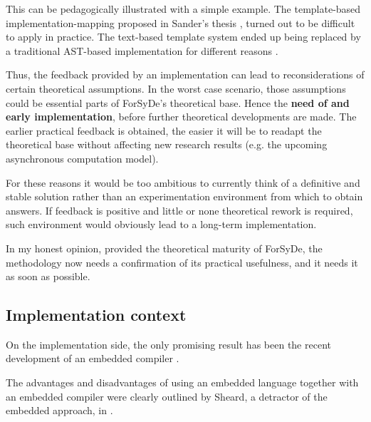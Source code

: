 \documentclass[a4paper,twoside,11pt]{article}
\begin{document}
  This can be pedagogically illustrated with a simple example. The
  template-based implementation-mapping proposed in Sander's thesis
  \cite{forsyde:thesis}, turned out to be difficult to apply in practice. The
  text-based template system ended up being replaced by a traditional
  AST-based implementation for different reasons \cite[section
  5.1.1]{forsyde:synthesis} .

  Thus, the feedback provided by an implementation can lead to
  reconsiderations of certain theoretical assumptions. In the worst case
  scenario, those assumptions could be essential parts of ForSyDe's theoretical
  base. Hence the \textbf{need of and early implementation}, before further
  theoretical developments are made. The earlier practical feedback is
  obtained, the easier it will be to readapt the theoretical base without
  affecting new research results (e.g. the upcoming asynchronous computation
  model).
  
  For these reasons it would be too ambitious to currently think of a
  definitive and stable solution rather than an experimentation environment
  from which to obtain answers. If feedback is positive and little or none
  theoretical rework is required, such environment would obviously lead to a
  long-term implementation.

  In my honest opinion, provided the theoretical maturity of ForSyDe, the
  methodology now needs a confirmation of its practical usefulness, and it
  needs it as soon as possible.

\subsection{Implementation context}

On the implementation side, the only promising result has been the recent
development of an embedded compiler \cite{forsyde:synthesis}.

  The advantages and disadvantages of using an embedded language together with
  an embedded compiler were clearly outlined by Sheard, a detractor of the
  embedded approach, in \cite{another}.  
\end{document}
